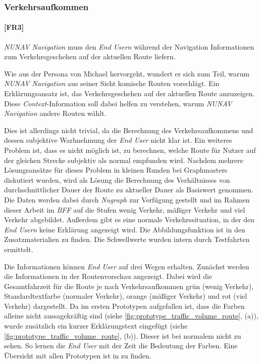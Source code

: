 \subsubsection{Verkehrsaufkommen}
\label{sec:traffic_volume_definition}

\paragraph{[FR3]} \textit{NUNAV Navigation} muss den \textit{End Usern} während der Navigation Informationen zum Verkehrsgeschehen auf der aktuellen Route liefern.

Wie aus der Persona von Michael hervorgeht, wundert er sich zum Teil, warum \textit{NUNAV Navigation} aus seiner Sicht \glqq komische\grqq{} Routen vorschlägt. Ein Erklärungsansatz ist, das Verkehrsgeschehen auf der aktuellen Route anzuzeigen. Diese \textit{Context}-Information soll dabei helfen zu verstehen, warum \textit{NUNAV Navigation} andere Routen wählt. 

Dies ist allerdings nicht trivial, da die Berechnung des Verkehrsaufkommens und dessen subjektive Warhnehmung der \textit{End User} nicht klar ist. Ein weiteres Problem ist, dass es nicht möglich ist, zu berechnen, welche Route für Nutzer auf der gleichen Strecke subjektiv als \glqq normal\grqq{} empfunden wird. Nachdem mehrere Lösungsansätze für dieses Problem in kleinen Runden bei Graphmasters diskutiert wurden, wird als Lösung die Berechnung des Verhältnisses von durchschnittlicher Dauer der Route zu aktueller Dauer als Basiswert genommen. Die Daten werden dabei durch \textit{Nugraph} zur Verfügung gestellt und im Rahmen dieser Arbeit im \textit{BFF} auf die Stufen \glqq wenig Verkehr\grqq{}, \glqq mäßiger Verkehr\grqq{} und \glqq viel Verkehr\grqq{} abgebildet. Außerdem gibt es eine \glqq normale\grqq{} Verkehrssituation, in der den \textit{End Usern} keine Erklärung angezeigt wird. Die Abbildungsfunktion ist in den Zusatzmaterialien zu finden. Die Schwellwerte wurden intern durch Testfahrten ermittelt.

Die Informationen können \textit{End User} auf drei Wegen erhalten. Zunächst werden die Informationen in der Routenvorschau angezeigt. Dabei wird die Gesamtfahrzeit für die Route je nach Verkehrsaufkommen grün (wenig Verkehr), Standardtextfarbe (normaler Verkehr), orange (mäßiger Verkehr) und rot (viel Verkehr) dargestellt. Da im ersten Prototypen aufgefallen ist, dass die Farben alleine nicht aussagekräftig sind (siehe \autoref{fig:prototype_traffic_volume_route}, (a)), wurde zusätzlich ein kurzer Erklärungstext eingefügt (siehe \autoref{fig:prototype_traffic_volume_route}, (b)). Dieser ist bei \glqq normalem\grqq{} nicht zu sehen. So lernen die \textit{End User} mit der Zeit die Bedeutung der Farben. Eine Übersicht mit allen Prototypen ist in  zu finden.


